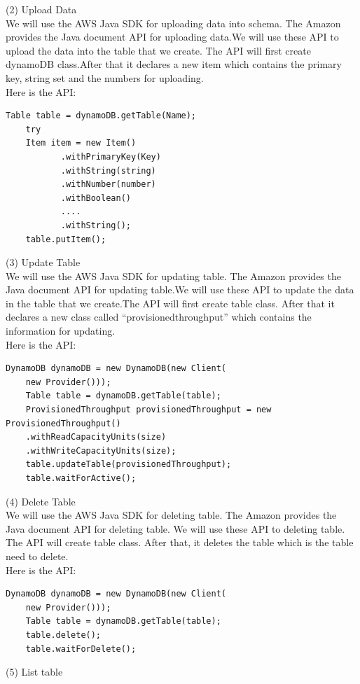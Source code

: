     (2) Upload Data\\
    We will use the AWS Java SDK for uploading data into schema. The Amazon provides the Java document API for uploading data.We will use these API to upload the data into the table that we create. The API will first create dynamoDB class.After that it declares a new item which contains the primary key, string set and the numbers for uploading.\\
    Here is the API\cite{w1}:\\
    \begin{lstlisting}[caption=API for Upload data]
    Table table = dynamoDB.getTable(Name);
    try 
    Item item = new Item()
           .withPrimaryKey(Key)
           .withString(string)
           .withNumber(number)
           .withBoolean()
           ....
           .withString();
    table.putItem();
  \end{lstlisting}
    (3) Update Table\\
    We will use the AWS Java SDK for updating table. The Amazon provides the Java document API for updating table.We will use these API to update the data in the table that we create.The API will first create table class. After that it declares a new class called “provisionedthroughput” which contains the information for updating.\\
    Here is the API\cite{w1}:
      \begin{lstlisting}[caption=API for update table]
    DynamoDB dynamoDB = new DynamoDB(new Client(
    new Provider()));
    Table table = dynamoDB.getTable(table);
    ProvisionedThroughput provisionedThroughput = new ProvisionedThroughput()
    .withReadCapacityUnits(size)
    .withWriteCapacityUnits(size);
    table.updateTable(provisionedThroughput);
    table.waitForActive();
\end{lstlisting}
    (4) Delete Table\\
    We will use the AWS Java SDK for deleting table. The Amazon provides the Java document API for deleting table. We will use these API to deleting table. The API will create table class. After that, it deletes the table which is the table need to delete.\\
    Here is the API\cite{w1}:
      \begin{lstlisting}[caption=API for delete data]
    DynamoDB dynamoDB = new DynamoDB(new Client(
    new Provider()));
    Table table = dynamoDB.getTable(table);
    table.delete();
    table.waitForDelete();
	\end{lstlisting}
    (5) List table\\
